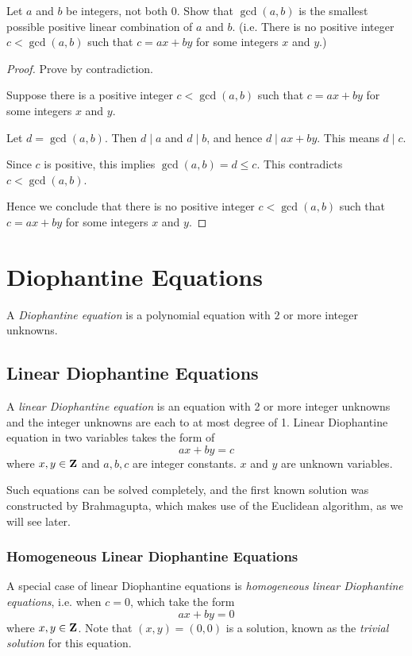 \begin{prbm}
Let $a$ and $b$ be integers, not both $0$. Show that $\gcd(a,b)$ is the smallest possible positive linear combination of $a$ and $b$. (i.e. There is no positive integer $c<\gcd(a,b)$ such that $c=ax+by$ for some integers $x$ and $y$.)
\end{prbm}

\begin{proof}
Prove by contradiction.

Suppose there is a positive integer $c<\gcd(a,b)$ such that $c=ax+by$ for some integers $x$ and $y$.

Let $d=\gcd(a,b)$. Then $d\mid a$ and $d\mid b$, and hence $d\mid ax+by$. This means $d\mid c$.

Since $c$ is positive, this implies $\gcd(a,b)=d\le c$. This contradicts $c<\gcd(a,b)$.

Hence we conclude that there is no positive integer $c<\gcd(a,b)$ such that $c=ax+by$ for some integers $x$ and $y$.
\end{proof}

\chapter{Diophantine Equations}
\begin{definition}
A \emph{Diophantine equation} is a polynomial equation with $2$ or more integer unknowns.
\end{definition}

\section{Linear Diophantine Equations}
A \emph{linear Diophantine equation} is an equation with 2 or more integer unknowns and the integer unknowns are each to at most degree of 1. Linear Diophantine equation in two variables takes the form of 
\[ax+by=c\]
where $x,y\in\mathbf Z$ and $a,b,c$ are integer constants. $x$ and $y$ are unknown variables.

Such equations can be solved completely, and the first known solution was constructed by Brahmagupta, which makes use of the Euclidean algorithm, as we will see later.

\subsection{Homogeneous Linear Diophantine Equations}
A special case of linear Diophantine equations is \emph{homogeneous linear Diophantine equations}, i.e. when $c=0$, which take the form
\[ax+by=0\]
where $x,y\in\mathbf Z$. Note that $(x,y)=(0,0)$ is a solution, known as the \emph{trivial solution} for this equation.

